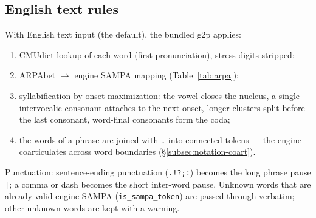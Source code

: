 \documentclass[11pt,a4paper]{article}
\begin{document}
\subsection{English text rules}

With English text input (the default), the bundled g2p applies:

\begin{enumerate}[leftmargin=1.5em]
\item CMUdict lookup of each word (first pronunciation), stress digits
      stripped;
\item ARPAbet \(\to\) engine SAMPA mapping (Table~\ref{tab:arpa});
\item syllabification by onset maximization: the vowel closes the
      nucleus, a single intervocalic consonant attaches to the next
      onset, longer clusters split before the last consonant, word-final
      consonants form the coda;
\item the words of a phrase are joined with \texttt{.} into connected
      tokens --- the engine coarticulates across word boundaries
      (\S\ref{subsec:notation-coart}).
\end{enumerate}

Punctuation: sentence-ending punctuation (\texttt{.!?;:}) becomes the
long phrase pause \texttt{|}; a comma or dash becomes the short inter-word
pause. Unknown words that are already valid engine SAMPA
(\texttt{is\_sampa\_token}) are passed through verbatim; other unknown
words are kept with a warning.
\end{document}
